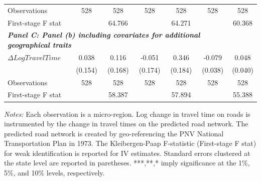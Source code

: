 \begin{table}[htbp]
{\begin{tabular}{l*{6}{c}}
Observations        &         528         &         528         &         528         &         528         &         528         &         528         \\
First-stage F stat  &                     &      64.766         &                     &      64.271         &                     &      60.368         \\
\hline

\multicolumn{6}{l}{\linebreak \textbf{\textit{Panel C: Panel (b) including covariates for additional geographical traits}}} \\
$\Delta Log Travel Time$&       0.038         &       0.116         &      -0.051         &       0.346\sym{*}  &      -0.079\sym{**} &       0.048         \\
&     (0.154)         &     (0.168)         &     (0.174)         &     (0.184)         &     (0.038)         &     (0.040)         \\

Observations        &         528         &         528         &         528         &         528         &         528         &         528         \\
First-stage F stat  &                     &      58.387         &                     &      57.894         &                     &      55.388         \\
\hline\hline
\end{tabular}}
\endgroup
\begin{minipage}{\linewidth}
    \vspace{0.1cm}
    {\footnotesize \textit{Notes: }  Each observation is a micro-region. Log change in travel time on roads is instrumented by the change in travel times on the predicted road network. The predicted road network is created by geo-referencing the PNV National Transportation Plan in 1973. The Kleibergen-Paap F-statistic (First-stage F stat) for weak identification is reported for IV estimates. Standard errors clustered at the state level are reported in paretheses. ***,**,* imply significance at the 1\%, 5\%, and 10\% levels, respectively.}
\end{minipage}
\end{table}
